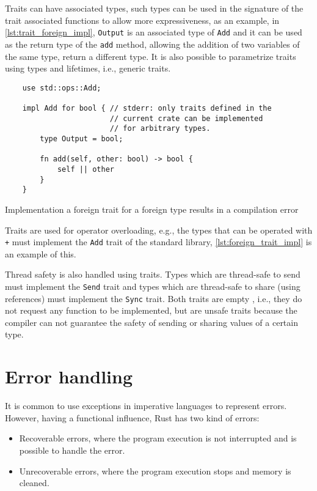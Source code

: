 Traits can have associated types, such types can be used in the signature of the
trait associated functions to allow more expressiveness, as an example, in
\ref{lst:trait_foreign_impl}, \texttt{Output} is an associated type of
\texttt{Add} and it can be used as the return type of the \texttt{add} method,
allowing the addition of two variables of the same type, return a different
type. It is also possible to parametrize traits using types and lifetimes, i.e.,
generic traits.

\begin{listing}[ht]
	\begin{verbatim}
    use std::ops::Add;

    impl Add for bool { // stderr: only traits defined in the
                        // current crate can be implemented 
                        // for arbitrary types.
        type Output = bool;
        
        fn add(self, other: bool) -> bool {
            self || other
        }
    }
    \end{verbatim}
  \caption{Implementation a foreign trait for a foreign type results in a compilation error}
  \label{lst:foreign_trait_foreign_impl}
\end{listing}

Traits are used for operator overloading, e.g., the types that can be operated
with \texttt{+} must implement the \texttt{Add} trait of the standard library,
\ref{lst:foreign_trait_impl} is an example of this. 

Thread safety is also handled using traits. Types which are thread-safe to send
must implement the \texttt{Send} trait and types which are thread-safe to share
(using references) must implement the \texttt{Sync} trait. Both traits are empty
, i.e., they do not request any function to be implemented, but are unsafe
traits because the compiler can not guarantee the safety of sending or sharing
values of a certain type.

\section{Error handling}

It is common to use exceptions in imperative languages to represent errors.
However, having a functional influence, Rust has two kind of errors: 

\begin{itemize}
    \item Recoverable errors, where the program execution is not interrupted and
        is possible to handle the error.
    \item Unrecoverable errors, where the program execution stops and memory is
        cleaned.
\end{itemize}

